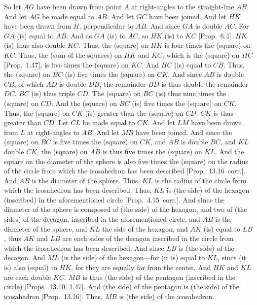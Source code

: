 \begin{Parallel}{}{}
{So let $AG$ have been drawn from point $A$ at right-angles to the straight-line
$AB$. And let $AG$ be made equal to $AB$. And let $GC$
have been joined. And let $HK$ have been drawn from $H$, perpendicular to $AB$. And since $GA$ is double $AC$. 
For $GA$ (is) equal to $AB$.  And as $GA$ (is) to $AC$, so
$HK$ (is) to $KC$ [Prop.~6.4]. $HK$ (is) thus also double
$KC$. Thus, the (square) on $HK$ is four times the (square)
on $KC$. Thus, the (sum of the squares) on $HK$ and $KC$,
which is the (square) on $HC$ [Prop.~1.47],  is five times the
(square) on $KC$.  And $HC$ (is) equal to $CB$. Thus,
the (square) on $BC$ (is) five times the (square) on  $CK$. 
And since $AB$ is double $CB$, of which $AD$ is double $DB$, 
the remainder $BD$ is thus double the remainder $DC$.
$BC$ (is) thus triple $CD$. The (square) on $BC$ (is) thus nine times 
the (square) on $CD$.  And the (square) on $BC$ (is) five times the (square)
on $CK$.  Thus, the (square) on $CK$ (is) greater than the (square) on $CD$.
$CK$ is thus greater than $CD$. Let $CL$ be made equal to $CK$.
And let $LM$ have been drawn from $L$ at right-angles to $AB$. 
And let $MB$ have been joined. And since the (square) on  $BC$
is five times the (square) on $CK$, and $AB$ is double $BC$, and $KL$
double $CK$, the (square) on $AB$ is thus five times the (square)
on $KL$. And the square on the diameter of the sphere  is also five times
the (square) on the radius of the circle from which the icosahedron has been
described [Prop.~13.16~corr.]. And $AB$ is the diameter of the sphere.
Thus, $KL$ is the radius of the circle from which the icosahedron has
been described. Thus, $KL$ is (the side) of the hexagon (inscribed) in the aforementioned
circle [Prop.~4.15~corr.]. And since the diameter of the sphere is composed of (the side) of the hexagon, and two of (the sides) of the decagon, inscribed
in the aforementioned circle, and $AB$ is the diameter of the sphere, 
and $KL$ the side of the hexagon, and $AK$ (is) equal to $LB$, thus
$AK$ and $LB$ are each sides of the decagon inscribed in the  circle
from which the icosahedron has been described. And since
$LB$ is (the side) of the decagon. And $ML$ (is the side) of the hexagon---for (it is) equal to $KL$, since (it is) also (equal) to $HK$, for they are equally
far from the center. And $HK$ and $KL$ are each double $KC$. 
$MB$ is thus (the side) of the pentagon (inscribed in the circle) [Props.~13.10, 1.47]. 
And (the side) of the pentagon is (the side) of the icosahedron [Prop.~13.16]. 
Thus, $MB$ is (the side) of the icosahedron. 

}
\end{Parallel}
